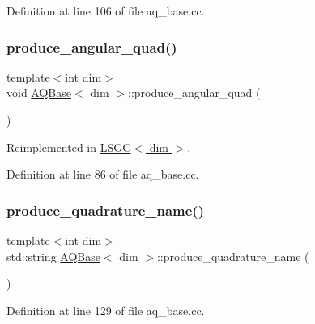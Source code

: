 Definition at line 106 of file aq\+\_\+base.\+cc.

\mbox{\label{class_a_q_base_a16c7871be0da6c112f547f39d50258fd}} 
\subsubsection{\texorpdfstring{produce\+\_\+angular\+\_\+quad()}{produce\_angular\_quad()}}
{\footnotesize\ttfamily template$<$int dim$>$ \\
void \hyperlink{class_a_q_base}{A\+Q\+Base}$<$ dim $>$\+::produce\+\_\+angular\+\_\+quad (\begin{DoxyParamCaption}{ }\end{DoxyParamCaption})\hspace{0.3cm}{\ttfamily [virtual]}}



Reimplemented in \hyperlink{class_l_s_g_c_a1d135fb9ca12a9b65b8cc397479fc4d7}{L\+S\+G\+C$<$ dim $>$}.



Definition at line 86 of file aq\+\_\+base.\+cc.

\mbox{\label{class_a_q_base_a4ae1370033705c82d08686fd651ad6e8}} 
\subsubsection{\texorpdfstring{produce\+\_\+quadrature\+\_\+name()}{produce\_quadrature\_name()}}
{\footnotesize\ttfamily template$<$int dim$>$ \\
std\+::string \hyperlink{class_a_q_base}{A\+Q\+Base}$<$ dim $>$\+::produce\+\_\+quadrature\+\_\+name (\begin{DoxyParamCaption}{ }\end{DoxyParamCaption})\hspace{0.3cm}{\ttfamily [private]}}



Definition at line 129 of file aq\+\_\+base.\+cc.




